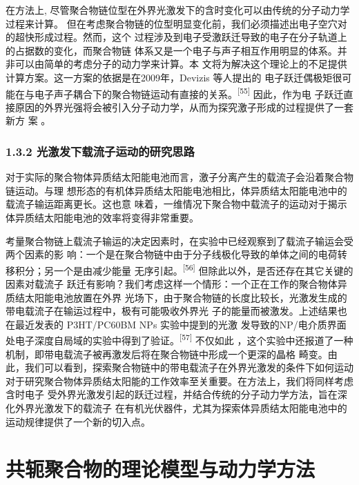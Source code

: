 \documentclass[12pt,]{report}
\begin{document}
在方法上,
尽管聚合物链位型在外界光激发下的含时变化可以由传统的分子动力学过程来计算。
但在考虑聚合物链的位型明显变化前，我们必须描述出电子空穴对的超快形成过程。然而，这个
过程涉及到电子受激跃迁导致的电子在分子轨道上的占据数的变化，而聚合物链
体系又是一个电子与声子相互作用明显的体系。并非可以由简单的考虑分子的动力学来计算。本
文将为解决这个理论上的不足提供计算方案。这一方案的依据是在2009年，Devizis
等人提出的
电子跃迁偶极矩很可能在与电子声子耦合下的聚合物链运动有直接的关系。\textsuperscript{{[}55{]}}
因此，作为电
子跃迁直接原因的外界光强将会被引入分子动力学，从而为探究激子形成的过程提供了一套新方
案 。

\subsection{1.3.2
光激发下载流子运动的研究思路}\label{ux5149ux6fc0ux53d1ux4e0bux8f7dux6d41ux5b50ux8fd0ux52a8ux7684ux7814ux7a76ux601dux8def}

对于实际的聚合物体异质结太阳能电池而言，激子分离产生的载流子会沿着聚合物链运动。与理
想形态的有机体异质结太阳能电池相比，体异质结太阳能电池中的载流子输运距离更长。这也意
味着，一维情况下聚合物中载流子的运动对于揭示体异质结太阳能电池的效率将变得非常重要。

考量聚合物链上载流子输运的决定因素时，在实验中已经观察到了载流子输运会受两个因素的影
响：一个是在聚合物链中由于分子线极化导致的单体之间的电荷转移积分；另一个是由减少能量
无序引起。\textsuperscript{{[}56{]}}
但除此以外，是否还存在其它关键的因素对载流子
跃迁有影响？我们考虑这样一个情形：一个正在工作的聚合物体异质结太阳能电池放置在外界
光场下，由于聚合物链的长度比较长，光激发生成的带电载流子在输运过程中，极有可能吸收外界光
子的能量而被激发。上述结果也在最近发表的 P3HT/PC60BM NPs
实验中提到的光激
发导致的NP/电介质界面处电子深度自局域的实验中得到了验证。\textsuperscript{{[}57{]}}
不仅如此
，这个实验中还报道了一种机制，即带电载流子被再激发后将在聚合物链中形成一个更深的晶格
畸变。由此，我们可以看到，探索聚合物链中的带电载流子在外界光激发的条件下如何运动
对于研究聚合物体异质结太阳能的工作效率至关重要。在方法上，我们将同样考虑含时电子
受外界光激发引起的跃迁过程，并结合传统的分子动力学方法，旨在深化外界光激发下的载流子
在有机光伏器件，尤其为探索体异质结太阳能电池中的运动规律提供了一个新的切入点。

\clearpage
\setcounter{equation}{0}

\pagestyle{fancy}

\chapter{共轭聚合物的理论模型与动力学方法}\label{ux5171ux8f6dux805aux5408ux7269ux7684ux7406ux8bbaux6a21ux578bux4e0eux52a8ux529bux5b66ux65b9ux6cd5}
\end{document}
